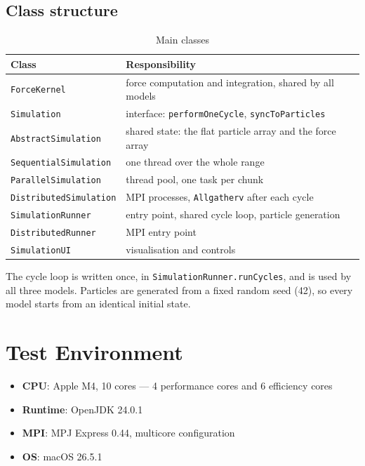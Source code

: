 \documentclass[sigconf]{acmart}
\begin{document}
\subsection{Class structure}

\begin{table}[h]
\centering
\caption{Main classes}
\begin{tabular}{@{}lp{4.4cm}@{}}
\toprule
Class & Responsibility \\
\midrule
\texttt{ForceKernel}           & force computation and integration, shared by all models \\
\texttt{Simulation}            & interface: \texttt{performOneCycle}, \texttt{syncToParticles} \\
\texttt{AbstractSimulation}    & shared state: the flat particle array and the force array \\
\texttt{SequentialSimulation}  & one thread over the whole range \\
\texttt{ParallelSimulation}    & thread pool, one task per chunk \\
\texttt{DistributedSimulation} & MPI processes, \texttt{Allgatherv} after each cycle \\
\texttt{SimulationRunner}      & entry point, shared cycle loop, particle generation \\
\texttt{DistributedRunner}     & MPI entry point \\
\texttt{SimulationUI}          & visualisation and controls \\
\bottomrule
\end{tabular}
\end{table}

The cycle loop is written once, in \texttt{SimulationRunner.runCycles}, and is used by all three
models. Particles are generated from a fixed random seed (42), so every model starts from an
identical initial state.

\section{Test Environment}

\begin{itemize}
    \item \textbf{CPU}: Apple M4, 10 cores --- 4 performance cores and 6 efficiency cores
    \item \textbf{Runtime}: OpenJDK 24.0.1
    \item \textbf{MPI}: MPJ Express 0.44, multicore configuration
    \item \textbf{OS}: macOS 26.5.1
\end{itemize}
\end{document}
